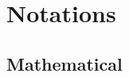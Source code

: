 \documentclass[12pt,a4paper]{amsbook}
\begin{document}
\frontmatter




%
%
%




\tableofcontents



\section*{Notations}

\subsection*{Mathematical}
\end{document}
